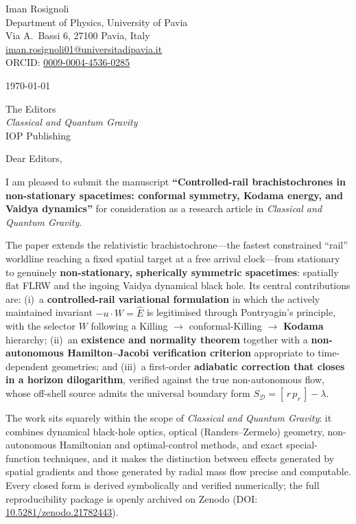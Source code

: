 \documentclass[11pt]{article}
\begin{document}
\thispagestyle{empty}

\noindent
Iman Rosignoli\\
Department of Physics, University of Pavia\\
Via A.\ Bassi 6, 27100 Pavia, Italy\\
\href{mailto:iman.rosignoli01@universitadipavia.it}{iman.rosignoli01@universitadipavia.it}\\
ORCID: \href{https://orcid.org/0009-0004-4536-0285}{0009-0004-4536-0285}

\vspace{0.6em}
\noindent\today

\vspace{0.6em}
\noindent
The Editors\\
\emph{Classical and Quantum Gravity}\\
IOP Publishing

\vspace{0.6em}
\noindent Dear Editors,

\vspace{0.5em}
I am pleased to submit the manuscript \textbf{``Controlled-rail brachistochrones in
non-stationary spacetimes: conformal symmetry, Kodama energy, and Vaidya dynamics''} for
consideration as a research article in \emph{Classical and Quantum Gravity}.

The paper extends the relativistic brachistochrone---the fastest constrained ``rail''
worldline reaching a fixed spatial target at a free arrival clock---from stationary to
genuinely \textbf{non-stationary, spherically symmetric spacetimes}: spatially flat FLRW
and the ingoing Vaidya dynamical black hole. Its central contributions are: (i)~a
\textbf{controlled-rail variational formulation} in which the actively maintained
invariant $-u\cdot W=\hat E$ is legitimised through Pontryagin's principle, with the
selector $W$ following a Killing $\to$ conformal-Killing $\to$ \textbf{Kodama} hierarchy;
(ii)~an \textbf{existence and normality theorem} together with a \textbf{non-autonomous
Hamilton--Jacobi verification criterion} appropriate to time-dependent geometries; and
(iii)~a first-order \textbf{adiabatic correction that closes in a horizon dilogarithm},
verified against the true non-autonomous flow, whose off-shell source admits the universal
boundary form $S_{\mathcal D}=[\,r\,p_r\,]-\lambda$.

The work sits squarely within the scope of \emph{Classical and Quantum Gravity}: it
combines dynamical black-hole optics, optical (Randers--Zermelo) geometry, non-autonomous
Hamiltonian and optimal-control methods, and exact special-function techniques, and it
makes the distinction between effects generated by spatial gradients and those generated
by radial mass flow precise and computable. Every closed form is derived symbolically and
verified numerically; the full reproducibility package is openly archived on Zenodo
(DOI: \href{https://doi.org/10.5281/zenodo.21782443}{10.5281/zenodo.21782443}).
\end{document}
